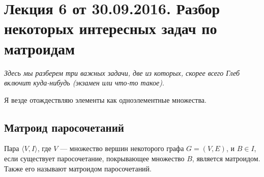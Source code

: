 
% 

\section{Лекция 6 от 30.09.2016. Разбор некоторых интересных
задач по матроидам}

\textit{Здесь мы разберем три важных задачи, две из которых, скорее всего Глеб включит
куда-нибудь (экзамен или что-то такое)}.

Я везде отождествляю элементы как одноэлементные множества.

\subsection{Матроид паросочетаний}

\begin{Lemma}
  Пара $\langle V, I\rangle$, где $V$ --- множество вершин
  некоторого графа $G = (V, E)$, и $B \in I$, если существует
  паросочетание, покрывающее множество $B$, является матроидом. Также его называют
  матроидом паросочетаний.
\end{Lemma}

